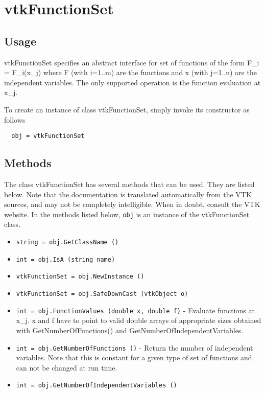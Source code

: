 \section{vtkFunctionSet}

\subsection{Usage}

 vtkFunctionSet specifies an abstract interface for set of functions
 of the form F\_i = F\_i(x\_j) where F (with i=1..m) are the functions
 and x (with j=1..n) are the independent variables.
 The only supported operation is the  function evaluation at x\_j.

To create an instance of class vtkFunctionSet, simply
invoke its constructor as follows
\begin{verbatim}
  obj = vtkFunctionSet
\end{verbatim}
\subsection{Methods}

The class vtkFunctionSet has several methods that can be used.
  They are listed below.
Note that the documentation is translated automatically from the VTK sources,
and may not be completely intelligible.  When in doubt, consult the VTK website.
In the methods listed below, \verb|obj| is an instance of the vtkFunctionSet class.
\begin{itemize}
\item  \verb|string = obj.GetClassName ()|

\item  \verb|int = obj.IsA (string name)|

\item  \verb|vtkFunctionSet = obj.NewInstance ()|

\item  \verb|vtkFunctionSet = obj.SafeDownCast (vtkObject o)|

\item  \verb|int = obj.FunctionValues (double x, double f)| -  Evaluate functions at x\_j.
 x and f have to point to valid double arrays of appropriate 
 sizes obtained with GetNumberOfFunctions() and
 GetNumberOfIndependentVariables.

\item  \verb|int = obj.GetNumberOfFunctions ()| -  Return the number of independent variables. Note that this is 
 constant for a given type of set of functions and can not be changed  
 at run time.

\item  \verb|int = obj.GetNumberOfIndependentVariables ()|

\end{itemize}
